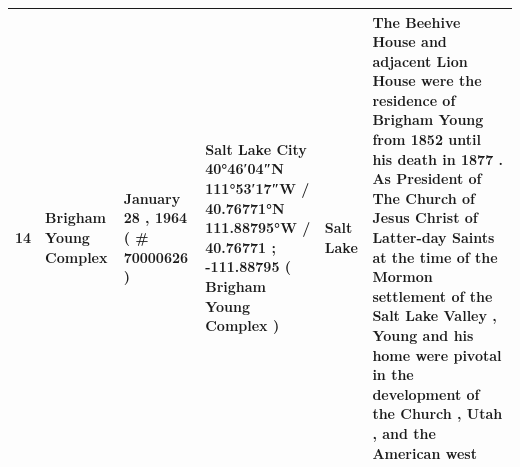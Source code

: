 \documentclass{article}
\begin{document}
\begin{tabular}{llllll}
14 & Brigham Young Complex & January 28 , 1964 ( \# 70000626 ) & Salt Lake City 40°46′04″N 111°53′17″W / 40.76771°N 111.88795°W / 40.76771 ; -111.88795 ( Brigham Young Complex ) & Salt Lake & The Beehive House and adjacent Lion House were the residence of Brigham Young from 1852 until his death in 1877 . As President of The Church of Jesus Christ of Latter-day Saints at the time of the Mormon settlement of the Salt Lake Valley , Young and his home were pivotal in the development of the Church , Utah , and the American west \\
\bottomrule
\end{tabular}
\end{document}
